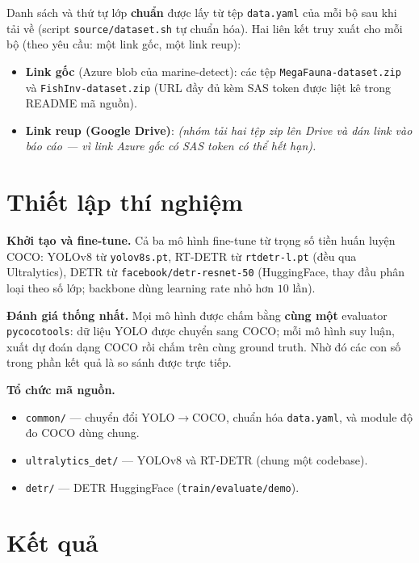 \documentclass[12pt]{article}
\newcommand{\runin}[1]{\par\medskip\noindent\textbf{#1}\hspace{0.4em}\ignorespaces}
\numberwithin{equation}{section}
\begin{document}
Danh sách và thứ tự lớp \textbf{chuẩn} được lấy từ tệp \texttt{data.yaml} của mỗi bộ sau khi
tải về (script \texttt{source/dataset.sh} tự chuẩn hóa). Hai liên kết truy xuất cho mỗi bộ
(theo yêu cầu: một link gốc, một link reup):
\begin{itemize}
  \item \textbf{Link gốc} (Azure blob của marine-detect): các tệp
  \texttt{MegaFauna-dataset.zip} và \texttt{FishInv-dataset.zip} (URL đầy đủ kèm SAS token
  được liệt kê trong README mã nguồn).
  \item \textbf{Link reup (Google Drive)}: \textit{(nhóm tải hai tệp zip lên Drive và dán link
  vào báo cáo --- vì link Azure gốc có SAS token có thể hết hạn).}
\end{itemize}

\section{Thiết lập thí nghiệm}

\runin{Khởi tạo và fine-tune.} Cả ba mô hình fine-tune từ trọng số tiền huấn luyện COCO:
YOLOv8 từ \texttt{yolov8s.pt}, RT-DETR từ \texttt{rtdetr-l.pt} (đều qua Ultralytics), DETR từ
\texttt{facebook/detr-resnet-50} (HuggingFace, thay đầu phân loại theo số lớp; backbone dùng
learning rate nhỏ hơn $10$ lần).

\runin{Đánh giá thống nhất.} Mọi mô hình được chấm bằng \textbf{cùng một} evaluator
\texttt{pycocotools}: dữ liệu YOLO được chuyển sang COCO; mỗi mô hình suy luận, xuất dự đoán
dạng COCO rồi chấm trên cùng ground truth. Nhờ đó các con số trong phần kết quả là so sánh
được trực tiếp.

\runin{Tổ chức mã nguồn.}
\begin{itemize}
  \item \texttt{common/} --- chuyển đổi YOLO$\rightarrow$COCO, chuẩn hóa \texttt{data.yaml}, và
  module độ đo COCO dùng chung.
  \item \texttt{ultralytics\_det/} --- YOLOv8 và RT-DETR (chung một codebase).
  \item \texttt{detr/} --- DETR HuggingFace (\texttt{train/evaluate/demo}).
\end{itemize}

\section{Kết quả}
\end{document}
